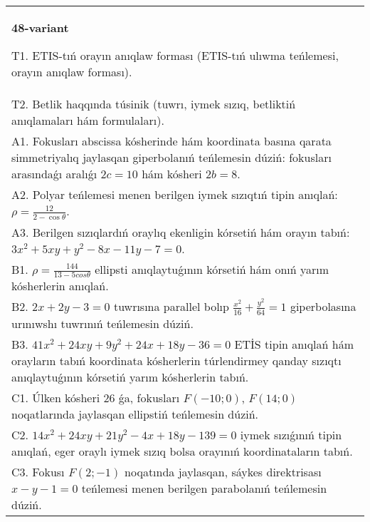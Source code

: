 \documentclass{article}
\begin{document}
\begin{tabular}{m{17cm}}
\textbf{48-variant}
\newline

T1. ETIS-tıń orayın anıqlaw forması (ETIS-tıń ulıwma teńlemesi, orayın anıqlaw forması).\\

T2. Betlik haqqında túsinik (tuwrı, iymek sızıq, betliktiń anıqlamaları hám formulaları).\\

A1. Fokusları abscissa kósherinde hám koordinata basına qarata simmetriyalıq jaylasqan giperbolanıń teńlemesin dúziń: fokusları arasındaǵı aralıǵı $2 c=10$ hám kósheri $2 b=8$.\\

A2. Polyar teńlemesi menen berilgen iymek sızıqtıń tipin anıqlań: $\rho=\frac{12}{2-\cos\theta}$.\\

A3. Berilgen sızıqlardıń oraylıq ekenligin kórsetiń hám orayın tabıń: $3 x^{2}+5 xy+y^{2}-8 x-11 y-7=0$.\\

B1. $\rho = \frac{144}{13 - 5cos\theta}$ ellipsti anıqlaytuǵının kórsetiń hám onıń yarım kósherlerin anıqlań.\\

B2. $2x + 2y - 3 = 0$ tuwrısına parallel bolıp $\frac{x^{2}}{16} + \frac{y^{2}}{64} = 1$ giperbolasına urınıwshı tuwrınıń teńlemesin dúziń.  \\

B3. $41x^{2} + 24xy + 9y^{2} + 24x + 18y - 36 = 0$ ETİS tipin anıqlań hám orayların tabıń koordinata kósherlerin túrlendirmey qanday sızıqtı anıqlaytuǵının kórsetiń yarım kósherlerin tabıń.  \\

C1. Úlken kósheri 26 ǵa, fokusları $F( - 10;0)$, $F(14;0)$ noqatlarında jaylasqan ellipstiń teńlemesin dúziń.  \\

C2. $14x^{2} + 24xy + 21y^{2} - 4x + 18y - 139 = 0$ iymek sızıǵınıń tipin anıqlań, eger oraylı iymek sızıq bolsa orayınıń koordinataların tabıń.  \\

C3. Fokusı $F(2; - 1)$ noqatında jaylasqan, sáykes direktrisası $x - y - 1 = 0$ teńlemesi menen berilgen parabolanıń teńlemesin dúziń.  \\

\end{tabular}
\vspace{1cm}
\end{document}
